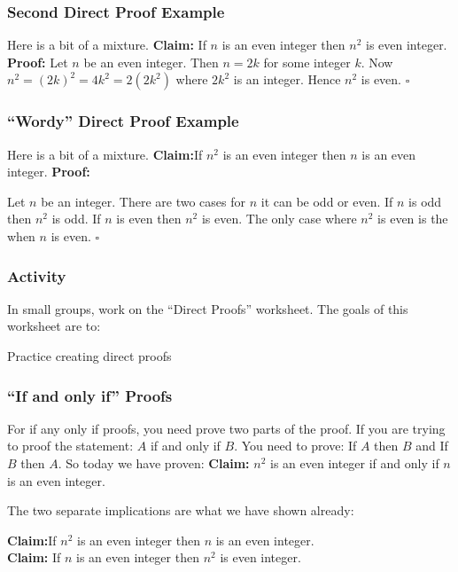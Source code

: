\documentclass{beamer}
\newcommand\Fontvi{\fontsize{6}{7.2}\selectfont}
\newenvironment{packed_enum}{
\begin{enumerate}
  \setlength{\itemsep}{1pt}
  \setlength{\parskip}{0pt}
  \setlength{\parsep}{0pt}
}{\end{enumerate}}
\begin{document}
\frame
{
  \frametitle{Second Direct Proof Example}


Here is a bit of a mixture.
\vfill
{\bf Claim:} If $n$ is an even integer then $n^2$ is even integer.
\pause \vfill
{\bf Proof:}
Let  $n$ be an even integer.   Then  $n=2k$ for some integer $k$.  Now $n^2=(2k)^2=4k^2=2(2k^2)$ where $2k^2$ is an integer.  Hence $n^2$ is even. $\square$


}

\frame
{
  \frametitle{``Wordy'' Direct Proof Example}


Here is a bit of a mixture.
\vfill
{\bf Claim:}If $n^2$ is an even integer then $n$ is an even integer.
\pause \vfill
{\bf Proof:}

Let  $n$ be an  integer.  There are two cases for $n$ it can be odd or even.  If $n$ is odd then $n^2$ is odd.  If $n$ is even then $n^2$ is even. The only case where  $n^2$ is even is the when $n$ is even. $\square$
}



\frame
{
  \frametitle{Activity}

In small groups, work on the ``Direct Proofs'' worksheet. The goals of this worksheet are to:
\vfill
\begin{packed_enum}
\item Practice creating direct proofs
\end{packed_enum}


}

\frame
{
  \frametitle{``If and only if'' Proofs}

For if any only if proofs, you need prove two parts of the proof.  If you are trying to proof the statement: $A$ if and only if $B$.  You need to prove: If $A$ then $B$ and If $B$ then $A$.
\vfill
So today we have proven:
\vfill
{\bf Claim:} $n^2$ is an even integer if and only if $n$ is an even integer.  

\vfill The two separate implications are what we have shown already:\vfill

{\bf Claim:}If $n^2$ is an even integer then $n$ is an even integer.\\

{\bf Claim:} If $n$ is an even integer then $n^2$ is even integer.

}
\end{document}
